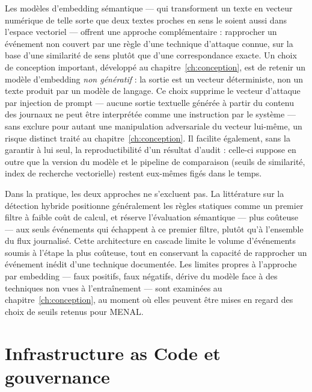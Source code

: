 Les modèles d'embedding sémantique --- qui transforment un texte en vecteur numérique de
telle sorte que deux textes proches en sens le soient aussi dans l'espace vectoriel
\parencite{devlin_bert2019} --- offrent une approche complémentaire : rapprocher un événement
non couvert par une règle d'une technique d'attaque connue, sur la base d'une similarité de
sens plutôt que d'une correspondance exacte. Un choix de conception important, développé au
chapitre~\ref{ch:conception}, est de retenir un modèle d'embedding \emph{non génératif} : la
sortie est un vecteur déterministe, non un texte produit par un modèle de langage. Ce choix
supprime le vecteur d'attaque par injection de prompt --- aucune sortie textuelle générée à
partir du contenu des journaux ne peut être interprétée comme une instruction par le système
--- sans exclure pour autant une manipulation adversariale du vecteur lui-même, un risque
distinct traité au chapitre~\ref{ch:conception}. Il facilite également, sans la garantir à lui
seul, la reproductibilité d'un résultat d'audit : celle-ci suppose en outre que la version du
modèle et le pipeline de comparaison (seuils de similarité, index de recherche vectorielle)
restent eux-mêmes figés dans le temps.

Dans la pratique, les deux approches ne s'excluent pas. La littérature sur la détection hybride
positionne généralement les règles statiques comme un premier filtre à faible coût de calcul,
et réserve l'évaluation sémantique --- plus coûteuse --- aux seuls événements qui échappent à ce
premier filtre, plutôt qu'à l'ensemble du flux journalisé. Cette architecture en cascade limite
le volume d'événements soumis à l'étape la plus coûteuse, tout en conservant la capacité de
rapprocher un événement inédit d'une technique documentée. Les limites propres à l'approche par
embedding --- faux positifs, faux négatifs, dérive du modèle face à des techniques non vues à
l'entraînement --- sont examinées au chapitre~\ref{ch:conception}, au moment où elles peuvent
être mises en regard des choix de seuils retenus pour MENAL.

\section{Infrastructure as Code et gouvernance}

